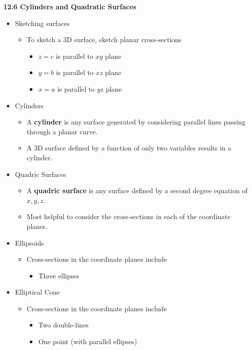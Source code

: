 \centerline{\bf 12.6 Cylinders and Quadratic Surfaces }

\begin{itemize}
\item Sketching surfaces

  \begin{itemize}
  \item To sketch a 3D surface, sketch planar cross-sections
    \begin{itemize}
    \item $z=c$ is parallel to $xy$ plane
    \item $y=b$ is parallel to $xz$ plane
    \item $x=a$ is parallel to $yz$ plane
    \end{itemize}
  \end{itemize}

\item Cylinders

  \begin{itemize}
  \item A \textbf{cylinder} is any surface generated by considering parallel lines passing through a planar curve.
  \item A 3D surface defined by a function of only two variables results in a cylinder.
  \end{itemize}

\item Quadric Surfaces

  \begin{itemize}
  \item A \textbf{quadric surface} is any surface defined by a second degree equation of $x,y,z$.
  \item Most helpful to consider the cross-sections in each of the coordinate planes.
  \end{itemize}

\item Ellipsoids
  \begin{itemize}
  \item Cross-sections in the coordinate planes include
    \begin{itemize}
    \item Three ellipses
    \end{itemize}
  \end{itemize}

\item Elliptical Cone
  \begin{itemize}
  \item Cross-sections in the coordinate planes include
    \begin{itemize}
    \item Two double-lines
    \item One point (with parallel ellipses)
    \end{itemize}
  \end{itemize}


\end{itemize}
